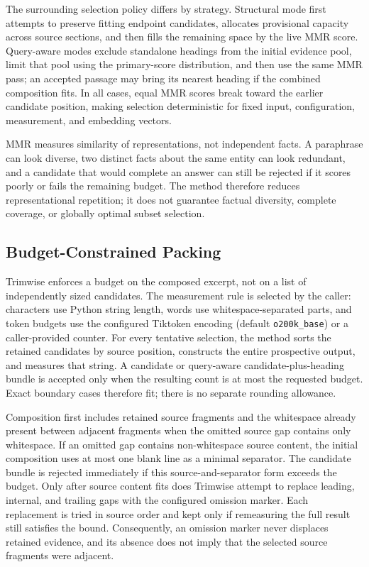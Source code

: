 \documentclass[
]{article}
\begin{document}
The surrounding selection policy differs by strategy. Structural mode
first attempts to preserve fitting endpoint candidates, allocates
provisional capacity across source sections, and then fills the
remaining space by the live MMR score. Query-aware modes exclude
standalone headings from the initial evidence pool, limit that pool
using the primary-score distribution, and then use the same MMR pass; an
accepted passage may bring its nearest heading if the combined
composition fits. In all cases, equal MMR scores break toward the
earlier candidate position, making selection deterministic for fixed
input, configuration, measurement, and embedding vectors.

MMR measures similarity of representations, not independent facts. A
paraphrase can look diverse, two distinct facts about the same entity
can look redundant, and a candidate that would complete an answer can
still be rejected if it scores poorly or fails the remaining budget. The
method therefore reduces representational repetition; it does not
guarantee factual diversity, complete coverage, or globally optimal
subset selection.

\subsection{Budget-Constrained
Packing}\label{budget-constrained-packing}

Trimwise enforces a budget on the composed excerpt, not on a list of
independently sized candidates. The measurement rule is selected by the
caller: characters use Python string length, words use
whitespace-separated parts, and token budgets use the configured
Tiktoken encoding (default \texttt{o200k\_base}) or a caller-provided
counter. For every tentative selection, the method sorts the retained
candidates by source position, constructs the entire prospective output,
and measures that string. A candidate or query-aware
candidate-plus-heading bundle is accepted only when the resulting count
is at most the requested budget. Exact boundary cases therefore fit;
there is no separate rounding allowance.

Composition first includes retained source fragments and the whitespace
already present between adjacent fragments when the omitted source gap
contains only whitespace. If an omitted gap contains non-whitespace
source content, the initial composition uses at most one blank line as a
minimal separator. The candidate bundle is rejected immediately if this
source-and-separator form exceeds the budget. Only after source content
fits does Trimwise attempt to replace leading, internal, and trailing
gaps with the configured omission marker. Each replacement is tried in
source order and kept only if remeasuring the full result still
satisfies the bound. Consequently, an omission marker never displaces
retained evidence, and its absence does not imply that the selected
source fragments were adjacent.
\end{document}
